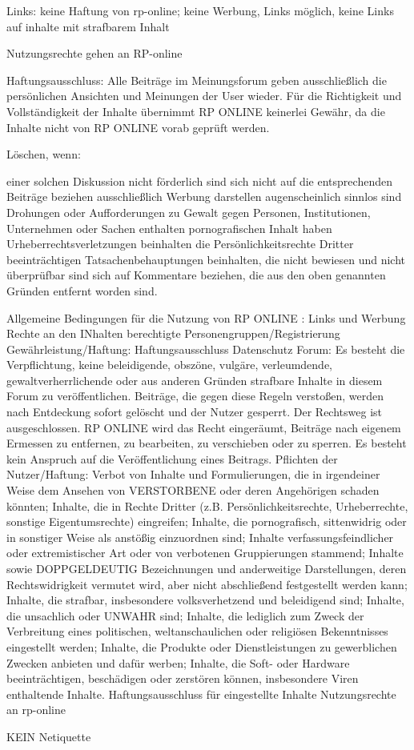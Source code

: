  Links: keine Haftung von rp-online; keine Werbung, Links möglich, keine Links auf inhalte mit strafbarem Inhalt
 
 Nutzungsrechte gehen an RP-online
 
 Haftungsausschluss: Alle Beiträge im Meinungsforum geben ausschließlich die persönlichen Ansichten und Meinungen der User wieder. Für die Richtigkeit und Vollständigkeit der Inhalte übernimmt RP ONLINE keinerlei Gewähr, da die Inhalte nicht von RP ONLINE vorab geprüft werden.
 
 Löschen, wenn: 
 
    einer solchen Diskussion nicht förderlich sind
    sich nicht auf die entsprechenden Beiträge beziehen
    ausschließlich Werbung darstellen
    augenscheinlich sinnlos sind
    Drohungen oder Aufforderungen zu Gewalt gegen Personen, Institutionen, Unternehmen oder Sachen enthalten
    pornografischen Inhalt haben
    Urheberrechtsverletzungen beinhalten
    die Persönlichkeitsrechte Dritter beeinträchtigen
    Tatsachenbehauptungen beinhalten, die nicht bewiesen und nicht überprüfbar sind
    sich auf Kommentare beziehen, die aus den oben genannten Gründen entfernt worden sind.


Allgemeine Bedingungen für die Nutzung von RP ONLINE :
	Links und Werbung
	Rechte an den INhalten
	berechtigte Personengruppen/Registrierung
	Gewährleistung/Haftung: Haftungsausschluss
	Datenschutz
	Forum: Es besteht die Verpflichtung, keine beleidigende, obszöne, vulgäre, verleumdende, gewaltverherrlichende oder aus anderen Gründen strafbare Inhalte in diesem Forum zu veröffentlichen. Beiträge, die gegen diese Regeln verstoßen, werden nach Entdeckung sofort gelöscht und der Nutzer gesperrt. Der Rechtsweg ist ausgeschlossen. RP ONLINE wird das Recht eingeräumt, Beiträge nach eigenem Ermessen zu entfernen, zu bearbeiten, zu verschieben oder zu sperren. Es besteht kein Anspruch auf die Veröffentlichung eines Beitrags. 
	Pflichten der Nutzer/Haftung: Verbot von
	Inhalte und Formulierungen, die in irgendeiner Weise dem Ansehen von VERSTORBENE oder deren Angehörigen schaden könnten;
    Inhalte, die in Rechte Dritter (z.B. Persönlichkeitsrechte, Urheberrechte, sonstige Eigentumsrechte) eingreifen;
    Inhalte, die pornografisch, sittenwidrig oder in sonstiger Weise als anstößig einzuordnen sind;
    Inhalte verfassungsfeindlicher oder extremistischer Art oder von verbotenen Gruppierungen stammend;
    Inhalte sowie DOPPGELDEUTIG Bezeichnungen und anderweitige Darstellungen, deren Rechtswidrigkeit vermutet wird, aber nicht abschließend festgestellt werden kann;
    Inhalte, die strafbar, insbesondere volksverhetzend und beleidigend sind;
    Inhalte, die unsachlich oder UNWAHR sind;
    Inhalte, die lediglich zum Zweck der Verbreitung eines politischen, weltanschaulichen oder religiösen Bekenntnisses eingestellt werden;
    Inhalte, die Produkte oder Dienstleistungen zu gewerblichen Zwecken anbieten und dafür werben;
    Inhalte, die Soft- oder Hardware beeinträchtigen, beschädigen oder zerstören können, insbesondere Viren enthaltende Inhalte.
    Haftungsausschluss für eingestellte Inhalte
    Nutzungsrechte an rp-online

KEIN Netiquette









